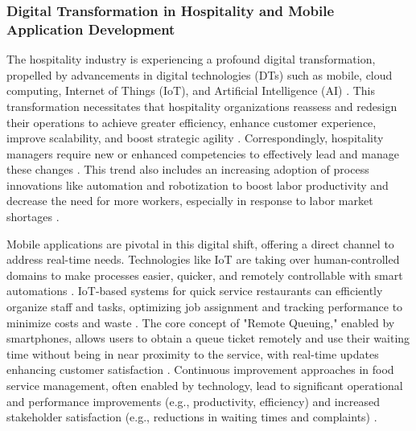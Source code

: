 \documentclass{article}
\begin{document}
\subsubsection{Digital Transformation in Hospitality and Mobile Application Development}
The hospitality industry is experiencing a profound digital transformation, propelled by advancements in digital technologies (DTs) such as mobile, cloud computing, Internet of Things (IoT), and Artificial Intelligence (AI) \parencite{busulwa2022digital}. This transformation necessitates that hospitality organizations reassess and redesign their operations to achieve greater efficiency, enhance customer experience, improve scalability, and boost strategic agility \parencite{busulwa2022digital}. Correspondingly, hospitality managers require new or enhanced competencies to effectively lead and manage these changes \parencite{busulwa2022digital}. This trend also includes an increasing adoption of process innovations like automation and robotization to boost labor productivity and decrease the need for more workers, especially in response to labor market shortages \parencite{buurman2024investigating}.

Mobile applications are pivotal in this digital shift, offering a direct channel to address real-time needs. Technologies like IoT are taking over human-controlled domains to make processes easier, quicker, and remotely controllable with smart automations \parencite{aytac2018iot}. IoT-based systems for quick service restaurants can efficiently organize staff and tasks, optimizing job assignment and tracking performance to minimize costs and waste \parencite{aytac2018iot}. The core concept of "Remote Queuing," enabled by smartphones, allows users to obtain a queue ticket remotely and use their waiting time without being in near proximity to the service, with real-time updates enhancing customer satisfaction \parencite{karu2013waiting}. Continuous improvement approaches in food service management, often enabled by technology, lead to significant operational and performance improvements (e.g., productivity, efficiency) and increased stakeholder satisfaction (e.g., reductions in waiting times and complaints) \parencite{monteiro2024comprehensive}.
\end{document}
